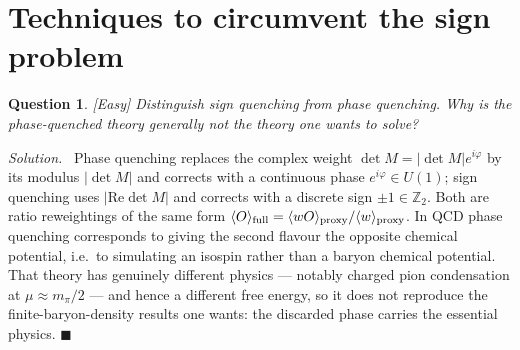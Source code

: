 \documentclass[11pt]{article}
\newcommand{\diff}[1]{\textcolor{blue!60!black}{\footnotesize\textsf{[#1]}}\quad}
\newtheorem{question}{Question}
\newenvironment{solution}{\par\smallskip\noindent\textit{Solution.}\ }{\hfill$\blacksquare$\par\smallskip}
\begin{document}
\section{Techniques to circumvent the sign problem}

\begin{question}
\diff{Easy} Distinguish sign quenching from phase quenching. Why is the phase-quenched theory generally not the theory one wants to solve?
\end{question}
\begin{solution}
Phase quenching replaces the complex weight $\det M = |\det M| e^{i\varphi}$ by its modulus $|\det M|$ and corrects with a continuous phase $e^{i\varphi}\in U(1)$; sign quenching uses $|\mathrm{Re}\det M|$ and corrects with a discrete sign $\pm1 \in \mathbb{Z}_2$. Both are ratio reweightings of the same form $\langle O\rangle_{\rm full} = \langle w O\rangle_{\rm proxy}/\langle w\rangle_{\rm proxy}$. In QCD phase quenching corresponds to giving the second flavour the opposite chemical potential, i.e.\ to simulating an isospin rather than a baryon chemical potential. That theory has genuinely different physics --- notably charged pion condensation at $\mu \approx m_\pi/2$ --- and hence a different free energy, so it does not reproduce the finite-baryon-density results one wants: the discarded phase carries the essential physics.
\end{solution}
\end{document}
